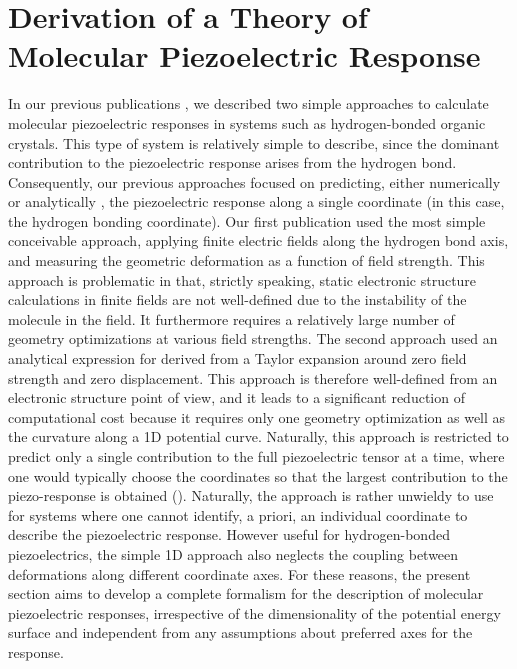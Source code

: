 \section{Derivation of a Theory of Molecular Piezoelectric Response}

In our previous publications \cite{Werling0,Werling1}, we described two simple approaches to calculate molecular piezoelectric responses in
systems such as hydrogen-bonded organic crystals. 
This type of system is relatively simple to describe, since the
dominant contribution to the piezoelectric response arises from the hydrogen bond. 
Consequently, our previous approaches
focused on predicting, either numerically \cite{Werling1} or analytically \cite{Werling0}, the piezoelectric response along a single
coordinate (in this case, the hydrogen bonding coordinate).  
Our first publication used the most simple conceivable
approach, applying finite electric fields along the hydrogen bond axis, and measuring the geometric deformation as a
function of field strength. 
This approach is problematic in that, strictly speaking, static electronic structure
calculations in finite fields are not well-defined due to the instability of the molecule in the field. 
It furthermore
requires a relatively large number of geometry optimizations at various field strengths.  
The second approach \cite{Werling0} used
an analytical expression for \dtt{} derived from a Taylor expansion around zero field strength and zero displacement.
This approach is therefore well-defined from an electronic structure point of view, and it leads to a significant
reduction of computational cost because it requires only one geometry optimization as well as the curvature along a 1D
potential curve.  
Naturally, this approach is restricted to predict only a single contribution to the full piezoelectric
tensor at a time, where one would typically choose the coordinates so that the largest contribution to the
piezo-response is obtained (\dtt{}). 
Naturally, the approach is rather unwieldy to use for systems where one cannot
identify, a priori, an individual coordinate to describe the piezoelectric response. 
However useful for hydrogen-bonded piezoelectrics, the simple 1D approach also neglects the coupling between deformations 
along different coordinate axes. 
For these reasons, the present section aims to develop a complete formalism for the description of molecular
piezoelectric responses, irrespective of the dimensionality of the potential energy surface and independent from any
assumptions about preferred axes for the response. 
